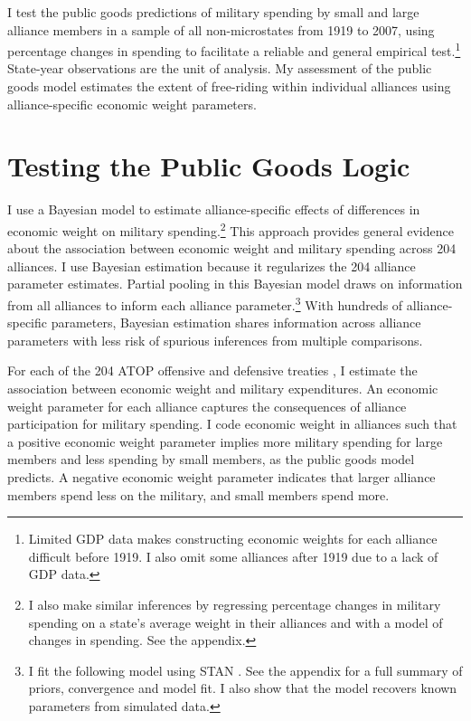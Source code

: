 \documentclass[12pt]{article}
\begin{document}
I test the public goods predictions of military spending by small and large alliance members in a sample of all non-microstates from 1919 to 2007, using percentage changes in spending to facilitate a reliable and general empirical test.\footnote{Limited GDP data makes constructing economic weights for each alliance difficult before 1919. I also omit some alliances after 1919 due to a lack of GDP data.}
State-year observations are the unit of analysis.
My assessment of the public goods model estimates the extent of free-riding within individual alliances using alliance-specific economic weight parameters.  
 

\section{Testing the Public Goods Logic}


I use a Bayesian model to estimate alliance-specific effects of differences in economic weight on military spending.\footnote{I also make similar inferences by regressing percentage changes in military spending on a state's average weight in their alliances and with a model of changes in spending. See the appendix.}
This approach provides general evidence about the association between economic weight and military spending across 204 alliances.
I use Bayesian estimation because it regularizes the 204 alliance parameter estimates.
Partial pooling in this Bayesian model draws on information from all alliances to inform each alliance parameter.\footnote{I fit the following model using STAN \citep{Carpenteretal2016}. See the appendix for a full summary of priors, convergence and model fit. I also show that the model recovers known parameters from simulated data.}
With hundreds of alliance-specific parameters, Bayesian estimation shares information across alliance parameters with less risk of spurious inferences from multiple comparisons. 


For each of the 204 ATOP offensive and defensive treaties \citep{Leedsetal2002}, I estimate the association between economic weight and military expenditures. 
An economic weight parameter for each alliance captures the consequences of alliance participation for military spending. 
I code economic weight in alliances such that a positive economic weight parameter implies more military spending for large members and less spending by small members, as the public goods model predicts. 
A negative economic weight parameter indicates that larger alliance members spend less on the military, and small members spend more. 
\end{document}
